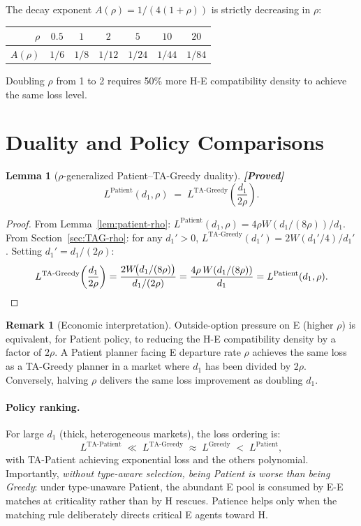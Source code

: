 \documentclass{article}
\theoremstyle{plain}
\newtheorem{lemma}{Lemma}
\theoremstyle{definition}
\newtheorem{remark}{Remark}
\newcommand{\proved}{\textcolor{provedgreen}{\textbf{[Proved]}}\,}
\begin{document}
The decay exponent $A(\rho)=1/(4(1+\rho))$ is strictly decreasing in $\rho$:
\begin{center}
\begin{tabular}{r|cccccc}
$\rho$   & $0.5$ & $1$   & $2$    & $5$    & $10$   & $20$\\\hline
$A(\rho)$& $1/6$ & $1/8$ & $1/12$ & $1/24$ & $1/44$ & $1/84$
\end{tabular}
\end{center}
Doubling $\rho$ from 1 to 2 requires 50\% more H-E compatibility density to
achieve the same loss level.

\section{Duality and Policy Comparisons}
\label{sec:duality}

\begin{lemma}[$\rho$-generalized Patient--TA-Greedy duality]
\label{lem:duality-rho}
\proved
\[
  L^{\mathrm{Patient}}(d_1,\rho)
  \;=\;
  L^{\mathrm{TA\text{-}Greedy}}\!\left(\frac{d_1}{2\rho}\right).
\]
\end{lemma}

\begin{proof}
From Lemma~\ref{lem:patient-rho}:
$L^{\mathrm{Patient}}(d_1,\rho)=4\rho W(d_1/(8\rho))/d_1$.
From Section~\ref{sec:TAG-rho}: for any $d_1'>0$,
$L^{\mathrm{TA\text{-}Greedy}}(d_1')=2W(d_1'/4)/d_1'$.
Setting $d_1'=d_1/(2\rho)$:
\[
  L^{\mathrm{TA\text{-}Greedy}}\!\left(\frac{d_1}{2\rho}\right)
  = \frac{2W\!\bigl(d_1/(8\rho)\bigr)}{d_1/(2\rho)}
  = \frac{4\rho\,W(d_1/(8\rho))}{d_1}
  = L^{\mathrm{Patient}}(d_1,\rho). \qedhere
\]
\end{proof}

\begin{remark}[Economic interpretation]
Outside-option pressure on E (higher $\rho$) is equivalent, for Patient
policy, to reducing the H-E compatibility density by a factor of $2\rho$.
A Patient planner facing E departure rate $\rho$ achieves the same loss as a
TA-Greedy planner in a market where $d_1$ has been divided by $2\rho$.
Conversely, halving $\rho$ delivers the same loss improvement as doubling
$d_1$.
\end{remark}

\paragraph{Policy ranking.}
For large $d_1$ (thick, heterogeneous markets), the loss ordering is:
\[
  L^{\text{TA-Patient}}
  \;\ll\;
  L^{\text{TA-Greedy}} \;\approx\; L^{\text{Greedy}}
  \;<\;
  L^{\text{Patient}},
\]
with TA-Patient achieving exponential loss and the others polynomial.
Importantly, \emph{without type-aware selection, being Patient is worse than
being Greedy}: under type-unaware Patient, the abundant E pool is consumed
by E-E matches at criticality rather than by H rescues.  Patience helps only
when the matching rule deliberately directs critical E agents toward H.
\end{document}
